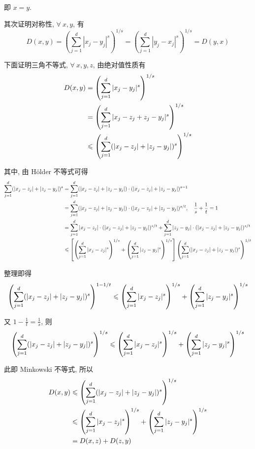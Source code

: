 \documentclass{article}
\begin{document}
即 $x=y$.

其次证明对称性, $\forall~x,y$, 有
\begin{equation}
  D(x,y)=\left(\sum_{j=1}^d|x_j-y_j|^s\right)^{1/s}=\left(\sum_{j=1}^d|y_j-x_j|^s\right)^{1/s}=D(y,x)
\end{equation}

下面证明三角不等式, $\forall~x,y,z$, 由绝对值性质有
\begin{equation}
  \begin{aligned}
    D(x,y)
    &=\left(\sum_{j=1}^d|x_j-y_j|^s\right)^{1/s}\\
    &=\left(\sum_{j=1}^d|x_j-z_j+z_j-y_j|^s\right)^{1/s}\\
    &\leqslant\left(\sum_{j=1}^d(|x_j-z_j|+|z_j-y_j|)^s\right)^{1/s}\\
  \end{aligned}
\end{equation}

其中, 由 H{\"o}lder 不等式可得
\begin{equation}
  \begin{aligned}
    \sum_{j=1}^d(|x_j-z_j|+|z_j-y_j|)^s
    &=\sum_{j=1}^d(|x_j-z_j|+|z_j-y_j|)\cdot(|x_j-z_j|+|z_j-y_j|)^{s-1}\\
    &=\sum_{j=1}^d(|x_j-z_j|+|z_j-y_j|)\cdot(|x_j-z_j|+|z_j-y_j|)^{s/t},\quad \frac{1}{s}+\frac{1}{t}=1\\
    &=\sum_{j=1}^d|x_j-z_j|\cdot(|x_j-z_j|+|z_j-y_j|)^{s/t}+\sum_{j=1}^d|z_j-y_j|\cdot(|x_j-z_j|+|z_j-y_j|)^{s/t}\\
    &\leqslant\left[\left(\sum_{j=1}^d|x_j-z_j|^s\right)^{1/s}+\left(\sum_{j=1}^d|z_j-y_j|^s\right)^{1/s}\right]\left(\sum_{j=1}^d(|x_j-z_j|+|z_j-y_j|)^{s}\right)^{1/t}\\
  \end{aligned}
\end{equation}

整理即得
\begin{equation}
    \left(\sum_{j=1}^d(|x_j-z_j|+|z_j-y_j|)^s\right)^{1-1/t}
    \leqslant\left(\sum_{j=1}^d|x_j-z_j|^s\right)^{1/s}+\left(\sum_{j=1}^d|z_j-y_j|^s\right)^{1/s}
\end{equation}

又 $1-\frac{1}{t}=\frac{1}{s}$, 则
\begin{equation}
  \left(\sum_{j=1}^d(|x_j-z_j|+|z_j-y_j|)^s\right)^{1/s}
  \leqslant\left(\sum_{j=1}^d|x_j-z_j|^s\right)^{1/s}+\left(\sum_{j=1}^d|z_j-y_j|^s\right)^{1/s}
\end{equation}

此即 Minkowski 不等式, 所以
\begin{equation}
  \begin{aligned}
    D(x,y)
    &\leqslant\left(\sum_{j=1}^d(|x_j-z_j|+|z_j-y_j|)^s\right)^{1/s}\\
    &\leqslant\left(\sum_{j=1}^d|x_j-z_j|^s\right)^{1/s}+\left(\sum_{j=1}^d|z_j-y_j|^s\right)^{1/s}\\
    &=D(x,z)+D(z,y)
  \end{aligned}
\end{equation}
\end{document}
